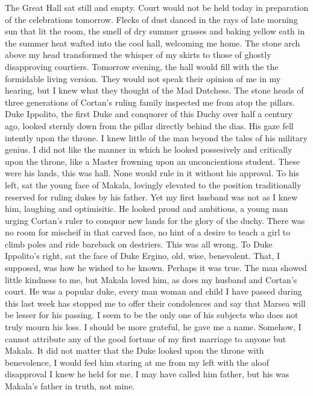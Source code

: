 \documentclass{article}
\begin{document}
The Great Hall sat still and empty. Court would not be held today in preparation of the celebrations tomorrow. Flecks of dust danced in the rays of late morning sun that lit the room, the smell of dry summer grasses and baking yellow eath in the summer heat wafted into the cool hall, welcoming me home. The stone arch above my head transformed the whisper of my skirts to those of ghostly disapproving courtiers. Tomorrow evening, the hall would fill with the the formidable living version. They would not speak their opinion of me in my hearing, but I knew what they thought of the Mad Dutchess. The stone heads of three generations of Cortan's ruling family inspected me from atop the pillars. Duke Ippolito, the first Duke and conquorer of this Duchy over half a century ago, looked sternly down from the pillar directly behind the dias. His gaze fell intently upon the throne. I knew little of the man beyond the tales of his military genius. I did not like the manner in which he looked possesively and critically upon the throne, like a Master frowning upon an unconcientious student. These were his lands, this was hall. None would rule in it without his approval. To his left, sat the young face of Makala, lovingly elevated to the position traditionally reserved for ruling dukes by his father. Yet my first husband was not as I knew him, laughing and optimisitic. He looked proud and ambitious, a young man urging Cortan's ruler to conquor new lands for the glory of the duchy. There was no room for mischeif in that carved face, no hint of a desire to teach a girl to climb poles and ride bareback on destriers. This was all wrong. To Duke Ippolito's right, sat the face of Duke Ergino, old, wise, benevolent. That, I supposed, was how he wished to be known. Perhaps it was true. The man showed little kindness to me, but Makala loved him, as does my husband and Cortan's court. He was a popular duke, every man woman and child I have passed during this last week has stopped me to offer their condolences and say that Marsea will be lesser for his passing. I seem to be the only one of his subjects who does not truly mourn his loss. I should be more grateful, he gave me a name. Somehow, I cannot attribute any of the good fortune of my first marriage to anyone but Makala. It did not matter that the Duke looked upon the throne with benevolence, I would feel him staring at me from my left with the aloof disapproval I knew he held for me. I may have called him father, but his was Makala's father in truth, not mine.
\end{document}
